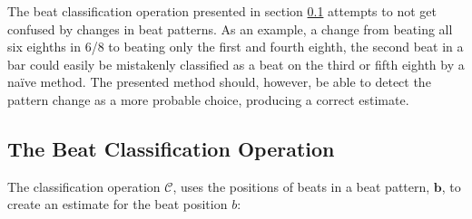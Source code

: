 The beat classification operation presented
in section \ref{sec:beat_classification_op}
attempts to not get confused by changes in beat patterns.
As an example, a change from beating all six eighths in 6/8
to beating only the first and fourth eighth,
the second beat in a bar could easily be mistakenly classified
as a beat on the third or fifth eighth
by a na\"ive method.
The presented method should, however,
be able to detect the pattern change as
a more probable choice,
producing a correct estimate.

\subsection{The Beat Classification Operation}
\label{sec:beat_classification_op}

The classification operation $\mathcal{C}$,
uses the positions of beats in a beat pattern, $\mathbf{b}$,
to create an estimate for the beat position $b$:
